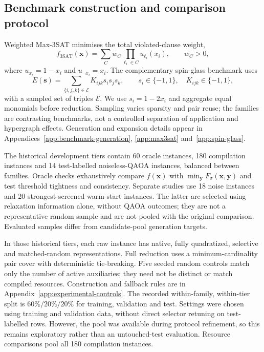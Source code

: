 \documentclass[a4paper,onecolumn,11pt,unpublished]{quantumarticle}
\theoremstyle{remark}
\begin{document}
\subsection{Benchmark construction and comparison protocol}
\label{sec:benchmark-protocol}

Weighted Max-3SAT minimises the total violated-clause weight,
\begin{equation}
 f_{\mathrm{3SAT}}(\bm x)=\sum_C w_C\prod_{\ell_i\in C}u_{\ell_i}(x_i),
 \qquad w_C>0,
 \label{eq:methods-max3sat}
\end{equation}
where $u_{x_i}=1-x_i$ and $u_{\neg x_i}=x_i$. The complementary spin-glass
benchmark uses
\begin{equation}
 E(\bm s)=\sum_{\{i,j,k\}\in\mathcal E}K_{ijk}s_is_js_k,
 \qquad s_i\in\{-1,1\},\quad K_{ijk}\in\{-1,1\},
 \label{eq:methods-cubic-spin}
\end{equation}
with a sampled set of triples $\mathcal E$. We use $s_i=1-2x_i$ and
aggregate equal monomials
before reduction. Sampling varies sparsity and pair reuse; the families are
contrasting benchmarks, not a controlled separation of application and
hypergraph effects. Generation and expansion details appear in
Appendices~\ref{app:benchmark-generation}, \ref{app:max3sat}
and~\ref{app:spin-glass}.

The historical development tiers contain 60 oracle instances, 180 compilation instances
and 14 test-labelled noiseless-QAOA instances, balanced between families.
Oracle checks exhaustively compare $f(\bm x)$ with
$\min_{\bm y}F_\sigma(\bm x,\bm y)$ and test threshold tightness and consistency.
Separate studies use 18 noise instances and 20 strongest-screened warm-start
instances. The latter are selected using relaxation information alone, without
QAOA outcomes; they are not a representative random sample and are not pooled
with the original comparison. Evaluated samples differ from candidate-pool
generation targets.

In those historical tiers, each raw instance has native, fully quadratized, selective and matched-random
representations. Full reduction uses a minimum-cardinality pair cover with
deterministic tie-breaking. Five seeded random controls match only the number
of active auxiliaries; they need not be distinct or match compiled resources.
Construction and fallback rules are in Appendix~\ref{app:experimental-controls}.
The recorded within-family, within-tier split is $60\%/20\%/20\%$ for
training, validation and test. Settings were chosen using training and
validation data, without direct selector retuning on test-labelled rows.
However, the pool was available during protocol refinement, so this remains
exploratory rather than an untouched-test evaluation. Resource comparisons
pool all 180 compilation instances.
\end{document}
